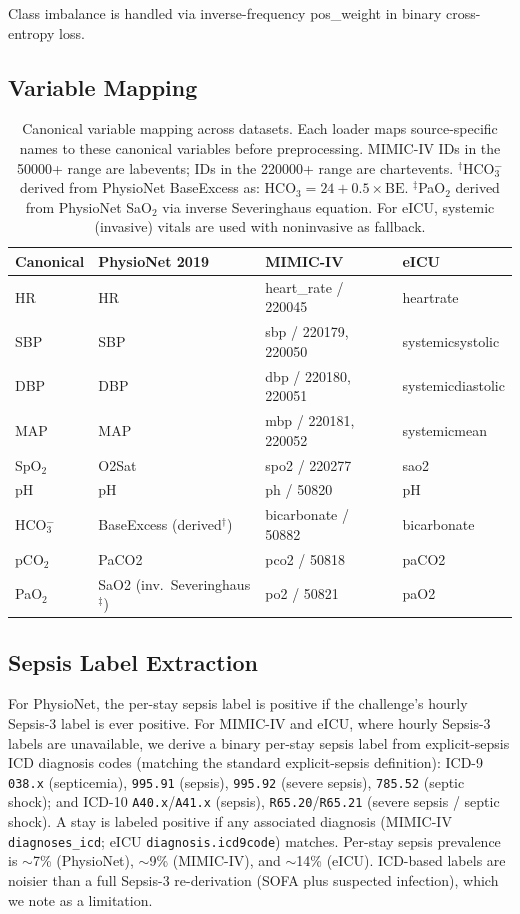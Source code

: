 \documentclass{article}
\begin{document}
Class imbalance is handled via inverse-frequency pos\_weight in binary cross-entropy loss.

\subsection{Variable Mapping}

\begin{table}[htbp]
\centering
\caption{Canonical variable mapping across datasets. Each loader maps source-specific names to these canonical variables before preprocessing. MIMIC-IV IDs in the 50000+ range are labevents; IDs in the 220000+ range are chartevents. $^\dagger$HCO$_3^-$ derived from PhysioNet BaseExcess as: $\text{HCO}_3 = 24 + 0.5 \times \text{BE}$. $^\ddagger$PaO$_2$ derived from PhysioNet SaO$_2$ via inverse Severinghaus equation. For eICU, systemic (invasive) vitals are used with noninvasive as fallback.}
\small
\begin{tabular}{@{}llll@{}}
\toprule
Canonical & PhysioNet 2019 & MIMIC-IV & eICU \\
\midrule
HR & HR & heart\_rate / 220045 & heartrate \\
SBP & SBP & sbp / 220179, 220050 & systemicsystolic \\
DBP & DBP & dbp / 220180, 220051 & systemicdiastolic \\
MAP & MAP & mbp / 220181, 220052 & systemicmean \\
SpO$_2$ & O2Sat & spo2 / 220277 & sao2 \\
pH & pH & ph / 50820 & pH \\
HCO$_3^-$ & BaseExcess (derived$^\dagger$) & bicarbonate / 50882 & bicarbonate \\
pCO$_2$ & PaCO2 & pco2 / 50818 & paCO2 \\
PaO$_2$ & SaO2 (inv.\ Severinghaus$^\ddagger$) & po2 / 50821 & paO2 \\
\bottomrule
\end{tabular}
\end{table}

\subsection{Sepsis Label Extraction}
For PhysioNet, the per-stay sepsis label is positive if the challenge's hourly Sepsis-3 label is ever positive. For MIMIC-IV and eICU, where hourly Sepsis-3 labels are unavailable, we derive a binary per-stay sepsis label from explicit-sepsis ICD diagnosis codes (matching the standard explicit-sepsis definition): ICD-9 \texttt{038.x} (septicemia), \texttt{995.91} (sepsis), \texttt{995.92} (severe sepsis), \texttt{785.52} (septic shock); and ICD-10 \texttt{A40.x}/\texttt{A41.x} (sepsis), \texttt{R65.20}/\texttt{R65.21} (severe sepsis / septic shock). A stay is labeled positive if any associated diagnosis (MIMIC-IV \texttt{diagnoses\_icd}; eICU \texttt{diagnosis.icd9code}) matches. Per-stay sepsis prevalence is $\sim$7\% (PhysioNet), $\sim$9\% (MIMIC-IV), and $\sim$14\% (eICU). ICD-based labels are noisier than a full Sepsis-3 re-derivation (SOFA plus suspected infection), which we note as a limitation.
\end{document}
